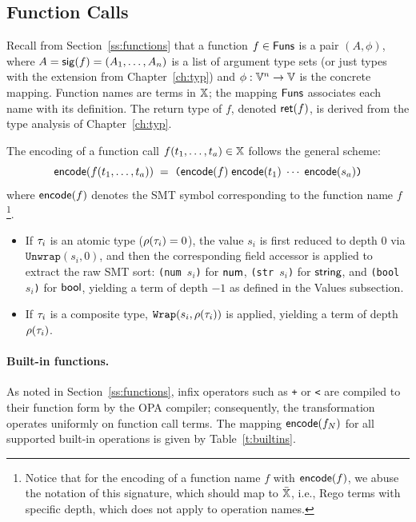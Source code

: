 \subsection{Function Calls}
\label{ss:func:t}

Recall from Section~\ref{ss:functions} that a \rego function $f \in \mathsf{Funs}$ is a pair
$(A, \phi)$, where $A = \mathsf{sig}(f) = (A_1, \ldots, A_n)$ is a list of argument type sets (or just types with the extension from Chapter~\ref{ch:typ}) and
$\phi : \mathbb{V}^n \to \mathbb{V}$ is the concrete mapping.
Function names are terms in $\mathbb{X}$; the mapping $\mathsf{Funs}$ associates each name with
its definition.
The return type of $f$, denoted $\mathsf{ret}(f)$, is derived from the type analysis of
Chapter~\ref{ch:typ}.

The encoding of a function call $f(t_1, \dots, t_a) \in \mathbb{X}$ follows the general
scheme:
$$\mathsf{encode}(f(t_1, \dots, t_a)) \;=\; \texttt{(}\mathsf{encode}(f)\; \mathsf{encode}(t_1)\; \cdots\; \mathsf{encode}(s_a)\texttt{)}$$
where $\mathsf{encode}(f)$ denotes the SMT symbol corresponding to the \rego function name
$f$\footnote{
  Notice that for the encoding of a function name $f$ with $\mathsf{encode}(f)$, we abuse
  the notation of this signature, which should map to $\bar{\mathbb{X}}$, i.e., Rego terms with
  specific depth, which does not apply to operation names.
}.
\begin{itemize}
  \item If $\tau_i$ is an atomic type ($\rho(\tau_i) = 0$), the value $s_i$ is first
        reduced to depth $0$ via $\texttt{Unwrap}(s_i, 0)$, and then the corresponding
        field accessor is applied to extract the raw SMT sort: \texttt{(num $s_i$)} for
        $\mathsf{num}$, \texttt{(str $s_i$)} for $\mathsf{string}$, and \texttt{(bool $s_i$)} for $\mathsf{bool}$,
        yielding a term of depth $-1$ as defined in the Values subsection.
  \item If $\tau_i$ is a composite type, $\texttt{Wrap}(s_i, \rho(\tau_i))$ is applied,
        yielding a term of depth $\rho(\tau_i)$.
\end{itemize}

\paragraph{Built-in functions.}
As noted in Section~\ref{ss:functions}, infix operators such as \texttt{+} or \texttt{<}
are compiled to their function form by the OPA compiler; consequently, the transformation
operates uniformly on function call terms.
The mapping $\mathsf{encode}(f_N)$ for all supported built-in operations is given by
Table~\ref{t:builtins}.

